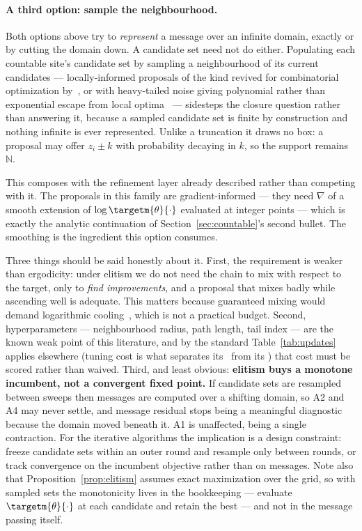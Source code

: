 \paragraph{A third option: sample the neighbourhood.} Both options above try to \emph{represent} a message over an infinite domain, exactly or by cutting the domain down. A candidate set need not do either. Populating each countable site's candidate set by sampling a neighbourhood of its current candidates --- locally-informed proposals of the kind revived for combinatorial optimization by~\citet{Sun2023a}, or with heavy-tailed noise giving polynomial rather than exponential escape from local optima~\citep{Wang2025} --- sidesteps the closure question rather than answering it, because a sampled candidate set is finite by construction and nothing infinite is ever represented. Unlike a truncation it draws no box: a proposal may offer $z_i \pm k$ with probability decaying in $k$, so the support remains $\mathbb{N}$.

This composes with the refinement layer already described rather than competing with it. The proposals in this family are gradient-informed --- they need $\nabla$ of a smooth extension of $\log \targetm{\theta}{\cdot}$ evaluated at integer points --- which is exactly the analytic continuation of Section~\ref{sec:countable}'s second bullet. The smoothing is the ingredient this option consumes.

Three things should be said honestly about it. First, the requirement is weaker than ergodicity: under elitism we do not need the chain to mix with respect to the target, only to \emph{find improvements}, and a proposal that mixes badly while ascending well is adequate. This matters because guaranteed mixing would demand logarithmic cooling~\citep{Geman1984}, which is not a practical budget. Second, hyperparameters --- neighbourhood radius, path length, tail index --- are the known weak point of this literature, and by the standard Table~\ref{tab:updates} applies elsewhere (tuning cost is what separates its \cmark\ from its \xmark) that cost must be scored rather than waived. Third, and least obvious: \textbf{elitism buys a monotone incumbent, not a convergent fixed point.} If candidate sets are resampled between sweeps then messages are computed over a shifting domain, so A2 and A4 may never settle, and message residual stops being a meaningful diagnostic because the domain moved beneath it. A1 is unaffected, being a single contraction. For the iterative algorithms the implication is a design constraint: freeze candidate sets within an outer round and resample only between rounds, or track convergence on the incumbent objective rather than on messages. Note also that Proposition~\ref{prop:elitism} assumes exact maximization over the grid, so with sampled sets the monotonicity lives in the bookkeeping --- evaluate $\targetm{\theta}{\cdot}$ at each candidate and retain the best --- and not in the message passing itself.


